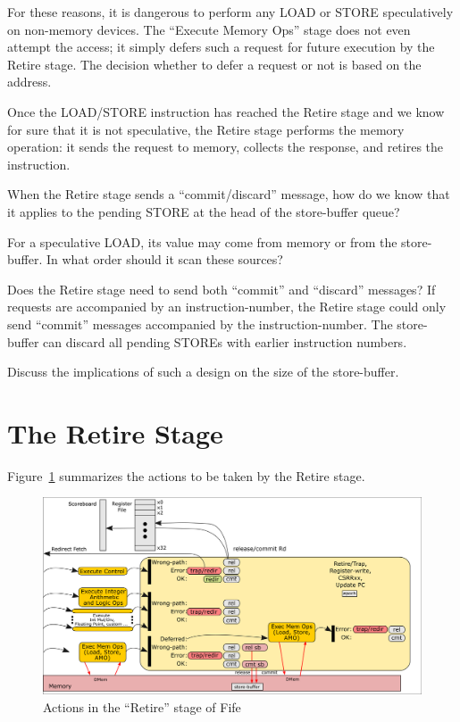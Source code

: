 For these reasons, it is dangerous to perform any LOAD or STORE
speculatively on non-memory devices.  The ``Execute Memory Ops'' stage
does not even attempt the access; it simply defers such a request for
future execution by the Retire stage.  The decision whether to defer a
request or not is based on the address.

Once the LOAD/STORE instruction has reached the Retire stage and we
know for sure that it is not speculative, the Retire stage performs
the memory operation: it sends the request to memory, collects the
response, and retires the instruction.


\hdivider

\Exercise

When the Retire stage sends a ``commit/discard'' message, how do we
know that it applies to the pending STORE at the head of the
store-buffer queue?

\Exercise

For a speculative LOAD, its value may come from memory or from the
store-buffer.  In what order should it scan these sources?

\Exercise

Does the Retire stage need to send both ``commit'' and ``discard''
messages?  If requests are accompanied by an instruction-number, the
Retire stage could only send ``commit'' messages accompanied by the
instruction-number.  The store-buffer can discard all pending STOREs
with earlier instruction numbers.

Discuss the implications of such a design on the size of the store-buffer.

\Endexercise


\section{The Retire Stage}

\label{Sec_Retire_Stage}

Figure~\ref{Fig_Fife_Retire} summarizes the actions to be taken by the
Retire stage.
\begin{figure}[htbp]
  \centerline{\includegraphics[width=6in,angle=0]{Figures/Fig_Fife_Retire}}
  \caption{\label{Fig_Fife_Retire}Actions in the ``Retire'' stage of Fife}
\end{figure}

